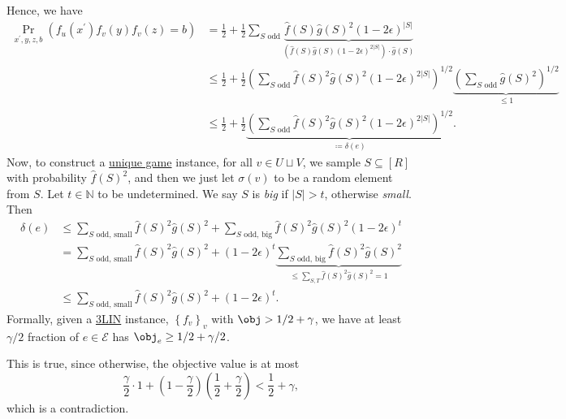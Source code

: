 Hence, we have
\[
	\begin{split}
		\Pr_{x^\prime, y, z, b}(f_u(x^\prime ) f_v(y) f_v(z) = b)
		 & = \frac{1}{2} + \frac{1}{2} \sum_{\text{\(S\) odd}} \underbrace{\hat{f} (S) \hat{g} (S)^{2} (1-2\epsilon ) ^{\vert S \vert }}_{(\hat{f} (S)\hat{g} (S) (1-2\epsilon )^{2 \vert S \vert })\cdot \hat{g} (S)}                   \\
		 & \leq \frac{1}{2} + \frac{1}{2} \left( \sum_{\text{\(S\) odd}} \hat{f} (S)^2 \hat{g} (S)^2 (1-2\epsilon )^{2 \vert S \vert } \right)^{1/2} \underbrace{\left( \sum_{\text{\(S\) odd}} \hat{g} (S)^2 \right) ^{1 / 2}}_{\leq 1} \\
		 & \leq \frac{1}{2} + \frac{1}{2} \underbrace{\left( \sum_{\text{\(S\) odd}} \hat{f} (S)^2 \hat{g} (S)^2 (1-2\epsilon )^{2 \vert S \vert } \right) ^{1 / 2}}_{\coloneqq \delta (e)}.
	\end{split}
\]
Now, to construct a \hyperref[prb:unique-game]{unique game} instance, for all \(v\in U \sqcup V\), we sample \(S \subseteq [R]\) with probability \(\hat{f} (S)^2\), and then we just let \(\sigma (v)\) to be a random element from \(S\). Let \(t\in \mathbb{N} \) to be undetermined. We say \(S\) is \emph{big} if \(\vert S \vert > t\), otherwise \emph{small}. Then
\[
	\begin{split}
		\delta (e)
		 & \leq \sum_{\text{\(S\) odd, small}} \hat{f} (S)^2 \hat{g} (S)^2 + \sum_{\text{\(S\) odd, big}} \hat{f} (S)^2 \hat{g} (S)^2 (1-2\epsilon )^t                                                              \\
		 & = \sum_{\text{\(S\) odd, small}} \hat{f} (S)^2 \hat{g} (S)^2 + (1-2\epsilon )^t \underbrace{\sum_{\text{\(S\) odd, big}} \hat{f} (S)^2 \hat{g} (S)^2}_{\leq \sum_{S, T} \hat{f} (S)^2 \hat{g} (S)^2 = 1} \\
		 & \leq \sum_{\text{\(S\) odd, small}} \hat{f} (S)^2 \hat{g} (S)^2 + (1-2\epsilon )^t.
	\end{split}
\]
Formally, given a \hyperref[prb:max-3LIN]{3LIN} instance, \(\left\{ f_v \right\} _{v}\) with \(\obj > 1/2 + \gamma \), we have at least \(\gamma / 2\) fraction of \(e\in \mathcal{E} \) has \(\obj_e \geq 1 / 2 + \gamma /2\).

\begin{note}
	This is true, since otherwise, the objective value is at most
	\[
		\frac{\gamma}{2}\cdot 1 + \left( 1 - \frac{\gamma}{2} \right) \left( \frac{1}{2}+ \frac{\gamma}{2} \right)  < \frac{1}{2} + \gamma ,
	\]
	which is a contradiction.
\end{note}

